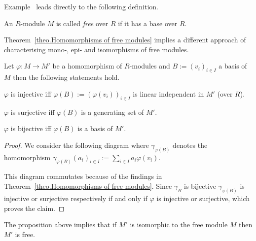 Example~ leads directly to the following definition.
\begin{defin}
An $R$-module $M$ is called \emph{free} over $R$ if it has a base over $R$.
\end{defin}

Theorem~\ref{theo.Homomorphisms of free modules} implies a different approach of characterising mono-, epi- and isomorphisms of free modules.
\begin{cor}
Let $\varphi\colon M\to M'$ be a homomorphism of $R$-modules and $B:=(v_i)_{i\in I}$ a basis of $M$ then the following statements hold.
\begin{compactenum}
\item $\varphi$ is injective iff $\varphi(B):=(\varphi(v_i))_{i\in I}$ is linear independent in $M'$ (over $R$).
\item $\varphi$ is surjective iff $\varphi(B)$ is a generating set of $M'$.
\item $\varphi$ is bijective iff $\varphi(B)$ is a basis of $M'$.
\end{compactenum}
\end{cor}
\begin{proof}
We consider the following diagram where $\gamma_{\varphi(B)}$ denotes the homomorphism $\gamma_{\varphi(B)}(a_i)_{i\in I}:=\sum_{i\in I}a_i\varphi(v_i)$.
\begin{center}
\end{center}
This diagram commutates because of the findings in Theorem~\ref{theo.Homomorphisms of free modules}. Since $\gamma_B$ is bijective $\gamma_{\varphi(B)}$ is injective or surjective respectively if and only if $\varphi$ is injective or surjective, which proves the claim.
\end{proof}
The proposition above implies that if $M'$ is isomorphic to the free module $M$ then $M'$ is free.


